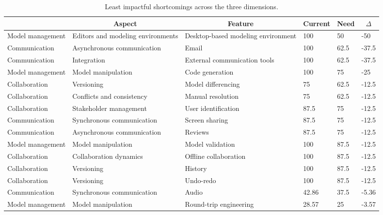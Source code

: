 
  \begin{table*}[]
  \centering
  \notsotiny
  \caption{ Least impactful shortcomings across the three dimensions.}
\label{tab:least-impactful}
\begin{tabular}{|l|l|l|l|l|l|}
  \hline
  \rowcolor[HTML]{C0C0C0}
    \multicolumn{1}{|c|}{Dimension} & \multicolumn{1}{c|}{Aspect} & \multicolumn{1}{c|}{Feature} & \multicolumn{1}{c|}{Current} & \multicolumn{1}{c|}{Need} & \multicolumn{1}{c|}{$\Delta$} \\ \hline
    Model management & Editors and modeling environments & Desktop-based modeling environment & 100 & 50 & -50 \\ \hline 
Communication & Asynchronous communication & Email & 100 & 62.5 & -37.5 \\ \hline 
Communication & Integration & External communication tools & 100 & 62.5 & -37.5 \\ \hline 
Model management & Model manipulation & Code generation & 100 & 75 & -25 \\ \hline 
Collaboration & Versioning & Model differencing & 75 & 62.5 & -12.5 \\ \hline 
Collaboration & Conflicts and consistency & Manual resolution & 75 & 62.5 & -12.5 \\ \hline 
Collaboration & Stakeholder management & User identification & 87.5 & 75 & -12.5 \\ \hline 
Communication & Synchronous communication & Screen sharing & 87.5 & 75 & -12.5 \\ \hline 
Communication & Asynchronous communication & Reviews & 87.5 & 75 & -12.5 \\ \hline 
Model management & Model manipulation & Model validation & 100 & 87.5 & -12.5 \\ \hline 
Collaboration & Collaboration dynamics & Offline collaboration & 100 & 87.5 & -12.5 \\ \hline 
Collaboration & Versioning & History & 100 & 87.5 & -12.5 \\ \hline 
Collaboration & Versioning & Undo-redo & 100 & 87.5 & -12.5 \\ \hline 
Communication & Synchronous communication & Audio & 42.86 & 37.5 & -5.36 \\ \hline 
Model management & Model manipulation & Round-trip engineering & 28.57 & 25 & -3.57 \\ \hline 

\end{tabular}
\end{table*}
